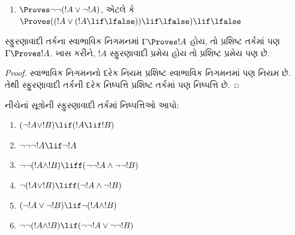 \begin{enumerate}
\item $\Proves \lnot\lnot(!A \lor \lnot !A)$, એટલે કે $\Proves ((!A \lor
  (!A \lif \lfalse))\lif \lfalse)\lif \lfalse$
\end{enumerate}

\begin{prop}
  સ્ફુરણાવાદી તર્કના સ્વાભાવિક નિગમનમાં $\Gamma \Proves !A$
  હોય, તો પ્રશિષ્ટ તર્કમાં પણ $\Gamma \Proves !A$. ખાસ કરીને,
  $!A$ સ્ફુરણાવાદી પ્રમેય હોય તો પ્રશિષ્ટ પ્રમેય પણ છે.
\end{prop}

\begin{proof}
  સ્વાભાવિક નિગમનનો દરેક નિયમ પ્રશિષ્ટ સ્વાભાવિક નિગમનમાં
  પણ નિયમ છે. તેથી સ્ફુરણાવાદી તર્કની દરેક નિષ્પત્તિ
  પ્રશિષ્ટ તર્કમાં પણ નિષ્પત્તિ છે.
\end{proof}

\begin{prob}
  નીચેનાં સૂત્રોની સ્ફુરણાવાદી તર્કમાં
  નિષ્પત્તિઓ આપો:
  \begin{enumerate}
    \item $(\lnot !A \lor !B) \lif (!A \lif !B)$
    \item $\lnot\lnot\lnot !A \lif \lnot !A$
    \item $\lnot\lnot (!A \land !B) \liff (\lnot\lnot !A\land \lnot \lnot !B)$
    \item $\lnot (!A \lor !B) \liff (\lnot !A \land \lnot !B)$
    \item $(\lnot !A \lor \lnot !B) \lif \lnot (!A \land !B)$
    \item $\lnot\lnot ( !A \land !B) \lif  (\lnot\lnot !A \lor
    \lnot\lnot !B)$
  \end{enumerate}
\end{prob}
\endgroup



